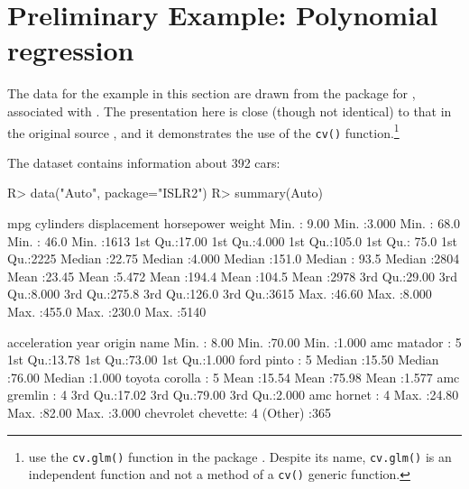\documentclass[
]{jss}
\begin{document}
\hypertarget{preliminary-example-polynomial-regression}{%
\section{Preliminary Example: Polynomial
regression}\label{preliminary-example-polynomial-regression}}

The data for the example in this section are drawn from the 
package for , associated with \citet{JamesEtAl:2021}. The
presentation here is close (though not identical) to that in the
original source \citep[ Secs. 5.1, 5.3]{JamesEtAl:2021}, and it
demonstrates the use of the \texttt{cv()} function.\footnote{\citet{JamesEtAl:2021}
  use the \texttt{cv.glm()} function in the  package
  \citep{CantyRipley2022, DavisonHinkley:1997}. Despite its name,
  \texttt{cv.glm()} is an independent function and not a method of a
  \texttt{cv()} generic function.}

The  dataset contains information about 392 cars:

\begin{CodeChunk}
\begin{CodeInput}
R> data("Auto", package="ISLR2")
R> summary(Auto)
\end{CodeInput}
\begin{CodeOutput}
      mpg          cylinders      displacement     horsepower        weight    
 Min.   : 9.00   Min.   :3.000   Min.   : 68.0   Min.   : 46.0   Min.   :1613  
 1st Qu.:17.00   1st Qu.:4.000   1st Qu.:105.0   1st Qu.: 75.0   1st Qu.:2225  
 Median :22.75   Median :4.000   Median :151.0   Median : 93.5   Median :2804  
 Mean   :23.45   Mean   :5.472   Mean   :194.4   Mean   :104.5   Mean   :2978  
 3rd Qu.:29.00   3rd Qu.:8.000   3rd Qu.:275.8   3rd Qu.:126.0   3rd Qu.:3615  
 Max.   :46.60   Max.   :8.000   Max.   :455.0   Max.   :230.0   Max.   :5140  
                                                                               
  acceleration        year           origin                      name    
 Min.   : 8.00   Min.   :70.00   Min.   :1.000   amc matador       :  5  
 1st Qu.:13.78   1st Qu.:73.00   1st Qu.:1.000   ford pinto        :  5  
 Median :15.50   Median :76.00   Median :1.000   toyota corolla    :  5  
 Mean   :15.54   Mean   :75.98   Mean   :1.577   amc gremlin       :  4  
 3rd Qu.:17.02   3rd Qu.:79.00   3rd Qu.:2.000   amc hornet        :  4  
 Max.   :24.80   Max.   :82.00   Max.   :3.000   chevrolet chevette:  4  
                                                 (Other)           :365  
\end{CodeOutput}
\end{CodeChunk}
\end{document}
